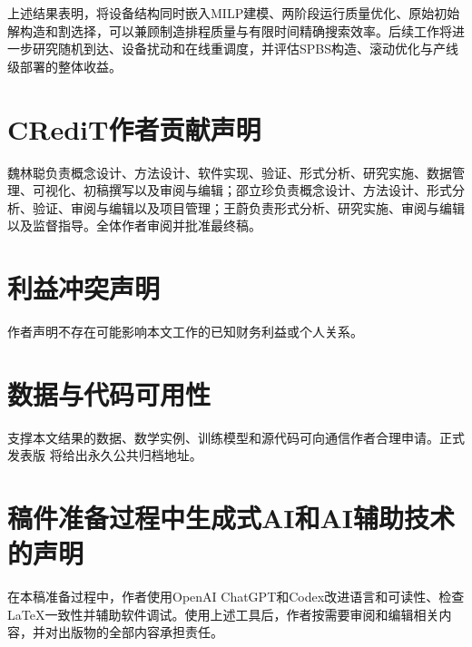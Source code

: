 \documentclass[final,5p,times,twocolumn]{elsarticle}
\begin{document}
上述结果表明，将设备结构同时嵌入MILP建模、两阶段运行质量优化、原始初始解构造和割选择，可以兼顾制造排程质量与有限时间精确搜索效率。后续工作将进一步研究随机到达、设备扰动和在线重调度，并评估SPBS构造、滚动优化与产线级部署的整体收益。

\section*{CRediT作者贡献声明}
魏林聪负责概念设计、方法设计、软件实现、验证、形式分析、研究实施、数据管理、可视化、初稿撰写以及审阅与编辑；邵立珍负责概念设计、方法设计、形式分析、验证、审阅与编辑以及项目管理；王蔚负责形式分析、研究实施、审阅与编辑以及监督指导。全体作者审阅并批准最终稿。

\section*{利益冲突声明}
作者声明不存在可能影响本文工作的已知财务利益或个人关系。

\section*{数据与代码可用性}
支撑本文结果的数据、数学实例、训练模型和源代码可向通信作者合理申请。正式发表版
将给出永久公共归档地址。

\section*{稿件准备过程中生成式AI和AI辅助技术的声明}
在本稿准备过程中，作者使用OpenAI ChatGPT和Codex改进语言和可读性、检查LaTeX一致性并辅助软件调试。使用上述工具后，作者按需要审阅和编辑相关内容，并对出版物的全部内容承担责任。
\end{document}

